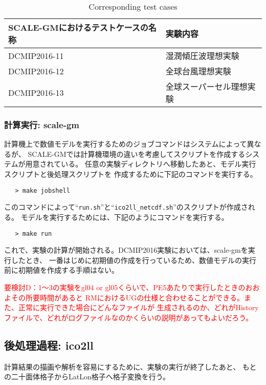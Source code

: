  \begin{table}[b]
 \begin{center}
 \caption{Corresponding test cases}
 \begin{tabularx}{150mm}{|l|X|} \hline
 \rowcolor[gray]{0.9} SCALE-GMにおけるテストケースの名称 & 実験内容 \\ \hline
  DCMIP2016-11 & 湿潤傾圧波理想実験  \\ \hline
  DCMIP2016-12 & 全球台風理想実験 \\ \hline
  DCMIP2016-13 & 全球スーパーセル理想実験 \\ \hline
 \end{tabularx}
 \end{center}
 \end{table}


\subsubsection{計算実行: scale-gm}

計算機上で数値モデルを実行するためのジョブコマンドはシステムによって異なるが、
SCALE-GMでは計算機環境の違いを考慮してスクリプトを作成するシステムが用意されている。
任意の実験ディレクトリへ移動したあと、モデル実行スクリプトと後処理スクリプトを
作成するために下記のコマンドを実行する。

 \begin{verbatim}
   > make jobshell
 \end{verbatim}

このコマンドによって``\verb|run.sh|''と``\verb|ico2ll_netcdf.sh|''のスクリプトが作成される。
モデルを実行するためには、下記のようにコマンドを実行する。

 \begin{verbatim}
   > make run
 \end{verbatim}

これで、実験の計算が開始される。DCMIP2016実験においては、scale-gmを実行したとき、
一番はじめに初期値の作成を行っているため、数値モデルの実行前に初期値を作成する手順はない。

\textcolor{red}{要検討D：1〜3の実験をgl04 or gl05くらいで、PE5あたりで実行したときのおおよその所要時間があると
 RMにおけるUGの仕様と合わせることができる。また、正常に実行できた場合にどんなファイルが
 生成されるのか、どれがHistoryファイルで、どれがログファイルなのかくらいの説明があってもよいだろう。}


\subsection{後処理過程: ico2ll}
計算結果の描画や解析を容易にするために、実験の実行が終了したあと、
もとの二十面体格子からLatLon格子へ格子変換を行う。

